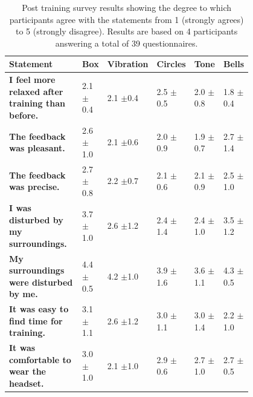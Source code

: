 \documentclass[a4paper,10pt,english,lof,lot,twoside]{puthesis}
\begin{document}
\begin{table}
\capstart
\begin{center}

\bodyspacing

\begin{tabular}{>{\raggedright\arraybackslash}p{0.30\linewidth} p{0.10\linewidth}  p{0.10\linewidth}  p{0.10\linewidth}  p{0.10\linewidth}  p{0.10\linewidth}}

\toprule
\textsf{\relax 
Statement
} & \textsf{\relax 
Box
} & \textsf{\relax 
Vibration
} & \textsf{\relax 
Circles
} & \textsf{\relax 
Tone
} & \textsf{\relax 
Bells
}\\
\hline\midrule

\textbf{I feel more relaxed after
training than before.}
 & 
2.1 \(\pm\)0.4
 & 
2.1 \(\pm\)0.4
 & 
2.5 \(\pm\)0.5
 & 
2.0 \(\pm\)0.8
 & 
1.8 \(\pm\)0.4
\\

\textbf{The feedback was
pleasant.}
 & 
2.6 \(\pm\)1.0
 & 
2.1 \(\pm\)0.6
 & 
2.0 \(\pm\)0.9
 & 
1.9 \(\pm\)0.7
 & 
2.7 \(\pm\)1.4
\\

\textbf{The feedback was
precise.}
 & 
2.7 \(\pm\)0.8
 & 
2.2 \(\pm\)0.7
 & 
2.1 \(\pm\)0.6
 & 
2.1 \(\pm\)0.9
 & 
2.5 \(\pm\)1.0
\\

\textbf{I was disturbed by my
surroundings.}
 & 
3.7 \(\pm\)1.0
 & 
2.6 \(\pm\)1.2
 & 
2.4 \(\pm\)1.4
 & 
2.4 \(\pm\)1.0
 & 
3.5 \(\pm\)1.2
\\

\textbf{My surroundings were
disturbed by me.}
 & 
4.4 \(\pm\)0.5
 & 
4.2 \(\pm\)1.0
 & 
3.9 \(\pm\)1.6
 & 
3.6 \(\pm\)1.1
 & 
4.3 \(\pm\)0.5
\\

\textbf{It was easy to find time
for training.}
 & 
3.1 \(\pm\)1.1
 & 
2.6 \(\pm\)1.2
 & 
3.0 \(\pm\)1.1
 & 
3.0 \(\pm\)1.4
 & 
2.2 \(\pm\)1.0
\\

\textbf{It was comfortable to wear
the headset.}
 & 
3.0 \(\pm\)1.0
 & 
2.1 \(\pm\)1.0
 & 
2.9 \(\pm\)0.6
 & 
2.7 \(\pm\)1.0
 & 
2.7 \(\pm\)0.5
\\
\hline\bottomrule

\end{tabular}
\caption[Result of survey]{Post training survey results showing the degree to which participants agree with the statements from 1 (strongly agrees) to 5 (strongly disagree). Results are based on 4 participants answering a total of 39 questionnaires.}\label{ch-evaluation/index:table-micro-questionary-result}
\end{center}
\end{table}
\end{document}
